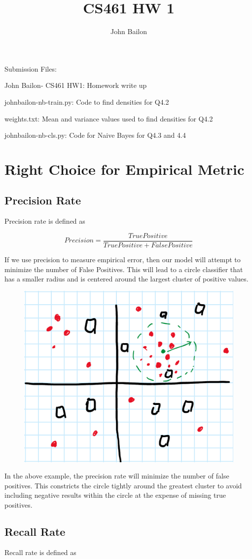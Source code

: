 \documentclass{article}
\title{CS461 HW 1}
\author{John Bailon}
\begin{document}
\maketitle

\noindent
Submission Files:

\noindent
John Bailon- CS461 HW1: Homework write up

\noindent
johnbailon-nb-train.py: Code to find densities for Q4.2

\noindent
weights.txt: Mean and variance values used to find densities for Q4.2

\noindent
johnbailon-nb-cls.py: Code for Naive Bayes for Q4.3 and 4.4 

\section{Right Choice for Empirical Metric}

\subsection{Precision Rate}
Precision rate is defined as 

\[Precision = \frac{True Positive}{True Positive + False Positive}\]

\noindent
If we use precision to measure empirical error, then our model will attempt to minimize the number of False Positives. This will lead to a circle classifier that has a smaller radius and is centered around the largest cluster of positive values.

\begin{figure}[h]
\centering
\includegraphics[width=0.35\linewidth]{Precision Figure.png}
\end{figure}

In the above example, the precision rate will minimize the number of false positives. This constricts the circle tightly around the greatest cluster to avoid including negative results within the circle at the expense of missing true positives.

\subsection{Recall Rate}
Recall rate is defined as 
\end{document}
